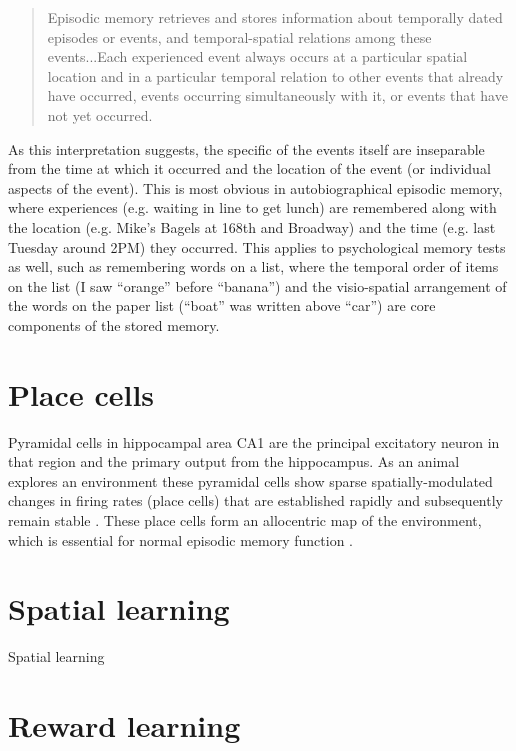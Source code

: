\begin{quote}
Episodic memory retrieves and stores information about temporally dated episodes or events, and temporal-spatial relations among these events...Each experienced event always occurs at a particular spatial location and in a particular temporal relation to other events that already have occurred, events occurring simultaneously with it, or events that have not yet occurred.
\end{quote}

As this interpretation suggests, the specific of the events itself are inseparable from the time at which it occurred and the location of the event (or individual aspects of the event).
This is most obvious in autobiographical episodic memory, where experiences (e.g. waiting in line to get lunch) are remembered along with the location (e.g. Mike's Bagels at 168th and Broadway) and the time (e.g. last Tuesday around 2PM) they occurred.
This applies to psychological memory tests as well, such as remembering words on a list, where the temporal order of items on the list (I saw ``orange'' before ``banana'') and the visio-spatial arrangement of the words on the paper list (``boat'' was written above ``car'') are core components of the stored memory.


\section{Place cells}
Pyramidal cells in hippocampal area CA1 are the principal excitatory neuron in that region and the primary output from the hippocampus.
As an animal explores an environment these pyramidal cells show sparse spatially-modulated changes in firing rates (place cells) that are established rapidly and subsequently remain stable \citep{O'Keefe1971}\citep{Frank2004}.
These place cells form an allocentric map of the environment, which is essential for normal episodic memory function \citep{Smith2006c}\citep{Nakazawa2004}\citep{Buzsaki2013}.


\section{Spatial learning}
Spatial learning

\section{Reward learning}